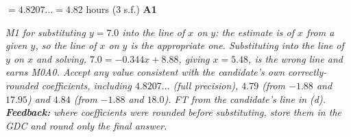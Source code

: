 \documentclass[12pt, twoside]{article}
\begin{document}
\begin{enumerate}[itemsep=0.3cm]
$= 4.8207\ldots = 4.82$ hours (3 s.f.) \hfill \textbf{A1}

\emph{M1 for substituting $y = 7.0$ into the line of $x$ on $y$: the
estimate is of $x$ from a given $y$, so the line of $x$ on $y$ is the
appropriate one. Substituting into the line of $y$ on $x$ and solving,
$7.0 = -0.344x + 8.88$, giving $x = 5.48$, is the wrong line and earns M0A0.
Accept any value consistent with the candidate's own correctly-rounded
coefficients, including $4.8207\ldots$ (full precision), $4.79$ (from $-1.88$
and $17.95$) and $4.84$ (from $-1.88$ and $18.0$). FT from the candidate's
line in (d). \textbf{Feedback:} where coefficients were rounded before
substituting, store them in the GDC and round only the final answer.}

\end{enumerate}
\end{document}
